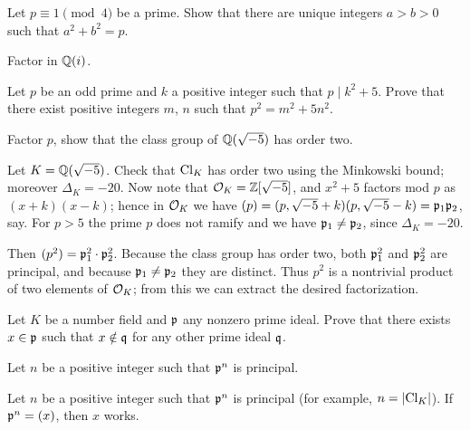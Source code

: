 \begin{problem}
	Let $p \equiv 1 \pmod 4$ be a prime.
	Show that there are unique integers $a > b > 0$ such that $a^2+b^2=p$.
	\begin{hint}
		Factor in $\mathbb Q(i)$.
	\end{hint}
\end{problem}

\begin{problem}
	Let $p$ be an odd prime and $k$ a positive integer such that $p \mid k^2+5$.
	Prove that there exist positive integers $m$, $n$ such that $p^2 = m^2+5n^2$.
	\begin{hint}
		Factor $p$, show that the class group of $\mathbb Q(\sqrt{-5})$ has order two.
	\end{hint}
	\begin{sol}
		Let $K = \mathbb Q(\sqrt{-5})$. Check that $\mathrm{Cl}_K$ has order two using the Minkowski bound;
		moreover $\Delta_K = -20$.
		Now note that $\mathcal O_K = \mathbb Z[\sqrt{-5}]$, and $x^2+5$ factors mod $p$ as $(x+k)(x-k)$;
		hence in $\mathcal O_K$ we have $(p) = (p, \sqrt{-5}+k)(p, \sqrt{-5}-k) = \mathfrak p_1 \mathfrak p_2$, say.
		For $p > 5$ the prime $p$ does not ramify and we have $\mathfrak p_1 \neq \mathfrak p_2$, since $\Delta_K = -20$.

		Then $(p^2) = \mathfrak p_1^2 \cdot \mathfrak p_2^2$. Because the class group has order two,
		both $\mathfrak p_1^2$ and $\mathfrak p_2^2$ are principal, and because $\mathfrak p_1 \neq \mathfrak p_2$ they are distinct.
		Thus $p^2$ is a nontrivial product of two elements of $\mathcal O_K$; from this we can extract the desired factorization.
	\end{sol}
\end{problem}

\begin{problem}
	Let $K$ be a number field and $\mathfrak p$ any nonzero prime ideal.
	Prove that there exists $x \in \mathfrak p$ such that $x \notin \mathfrak q$ for any
	other prime ideal $\mathfrak q$.
	\begin{hint}
		Let $n$ be a positive integer such that $\mathfrak p^n$ is principal.
	\end{hint}
	\begin{sol}
		Let $n$ be a positive integer such that $\mathfrak p^n$ is principal
		(for example, $n = |\mathrm{Cl}_K|$).
		If $\mathfrak p^n = (x)$, then $x$ works.
	\end{sol}
\end{problem}
